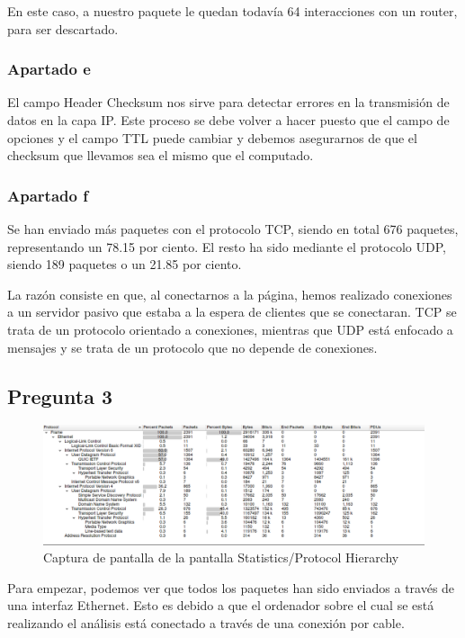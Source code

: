 \documentclass[spanish]{report} %
\begin{document}
En este caso, a nuestro paquete le quedan todavía 64 interacciones con un
router, para ser descartado.

\subsubsection{Apartado e}
El campo Header Checksum nos sirve para detectar errores en la transmisión de
datos en la capa IP. Este proceso se debe volver a hacer puesto que el campo de
opciones y el campo TTL puede cambiar y debemos asegurarnos de que el checksum
que llevamos sea el mismo que el computado.

\subsubsection{Apartado f}
Se han enviado más paquetes con el protocolo TCP, siendo en total 676 paquetes,
representando un 78.15 por ciento. El resto ha sido mediante el protocolo UDP,
siendo 189 paquetes o un 21.85 por ciento.\newline

La razón consiste en que, al conectarnos a la página, hemos realizado conexiones
a un servidor pasivo que estaba a la espera de clientes que se conectaran. TCP
se trata de un protocolo orientado a conexiones, mientras que UDP está enfocado
a mensajes y se trata de un protocolo que no depende de conexiones.

\subsection{Pregunta 3}

\begin{figure}[h]
\begin{center}
\includegraphics[scale=.3]{../img/3.png}
\end{center}
\caption{Captura de pantalla de la pantalla Statistics/Protocol Hierarchy}
\end{figure}

\newpage

Para empezar, podemos ver que todos los paquetes han sido enviados a través de
una interfaz Ethernet. Esto es debido a que el ordenador sobre el cual se está
realizando el análisis está conectado a través de una conexión por
cable.\newline
\end{document}
